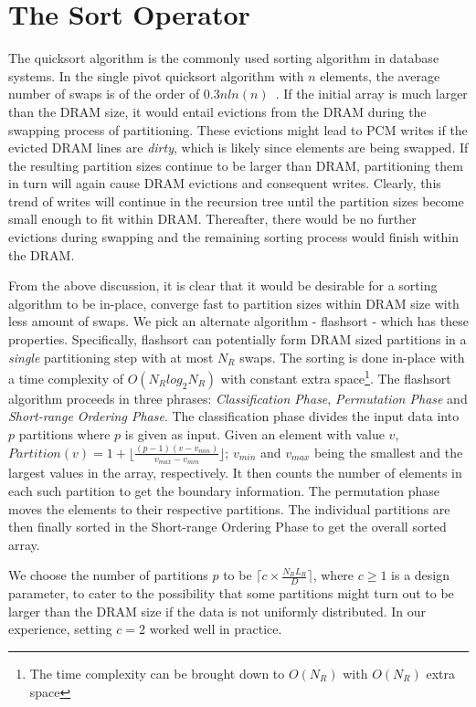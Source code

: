 \section{The Sort Operator}
\label{sort}

The quicksort algorithm is the commonly used sorting algorithm in database systems. In the
single pivot quicksort algorithm with $n$ elements, the average number
of swaps is of the order of $0.3nln(n)$~\cite{swaps}. If the initial array is much larger than the DRAM size, it would
entail evictions from the DRAM during the swapping process of
partitioning. These evictions might lead to PCM writes if the evicted
DRAM lines are \textit{dirty}, which is likely since elements are being
swapped. If the resulting partition sizes continue to be larger than
DRAM, partitioning them in turn will again cause DRAM evictions and
consequent writes. Clearly, this trend of writes will continue in the
recursion tree until the partition sizes become small enough to fit within
DRAM. Thereafter, there would be no further evictions during swapping
and the remaining sorting process would finish within the DRAM.

From the above discussion, it is clear that it would be desirable for a sorting algorithm to be in-place, converge fast to partition sizes within DRAM size with less amount of swaps. We pick an alternate algorithm - flashsort \cite{flashsort} - which has these properties. Specifically, flashsort can potentially form DRAM sized partitions in a \emph{single} partitioning step with at most $N_R$ swaps. The sorting is done in-place with a time complexity of $O(N_Rlog_2N_R)$ with constant extra space\footnote{The time complexity can be brought down to $O(N_R)$ with $O(N_R)$ extra space}. The flashsort algorithm proceeds in three phrases: \emph{Classification Phase}, \emph{Permutation Phase} and \emph{Short-range Ordering Phase}. The classification phase divides the input data into $p$ partitions where $p$ is given as input. Given an element with value $v$, $Partition(v) = 1 + \lfloor \frac{(p-1)(v- v_{min})}{v_{max}-v_{min}} \rfloor$; $v_{min}$ and $v_{max}$ being the smallest and the largest values in the array, respectively. It then counts the number of elements in each such partition to get the boundary information. The permutation phase moves the elements to their respective partitions. The individual partitions are then finally sorted in the Short-range Ordering Phase to get the overall sorted array.

We choose the number of partitions $p$ to be $\lceil c \times \frac{N_R L_R}{D} \rceil$, where $c \geq 1$ is a design
parameter, to cater to the possibility that some partitions might turn out to be larger than the DRAM size if the data is not uniformly distributed. In our experience, setting $c = 2$ worked well in practice.

